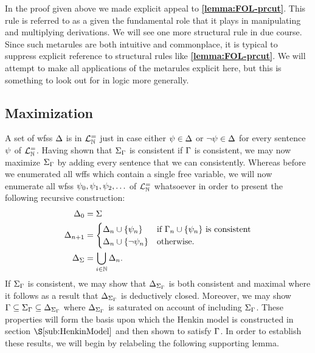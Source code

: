 In the proof given above we made explicit appeal to \textbf{\ref{lemma:FOL-prcut}}.
This rule is referred to as a  given the fundamental role that it plays in manipulating and multiplying derivations.
We will see one more structural rule in due course.
Since such metarules are both intuitive and commonplace, it is typical to suppress explicit reference to structural rules like \textbf{\ref{lemma:FOL-prcut}}.
We will attempt to make all applications of the metarules explicit here, but this is something to look out for in logic more generally.



\subsection{Maximization}%
  \label{sub:Maximization}
  
A set of wfss $\Delta$ is  in $\mathcal{L}^{=}_{\mathbb{N}}$ just in case either $\psi\in\Delta$ or $\neg\psi\in\Delta$ for every sentence $\psi$ of $\mathcal{L}^{=}_{\mathbb{N}}$.
Having shown that $\Sigma_{\Gamma}$ is consistent if $\Gamma$ is consistent, we may now maximize $\Sigma_{\Gamma}$ by adding every sentence that we can consistently. 
Whereas before we enumerated all wffs which contain a single free variable, we will now enumerate all wfss $\psi_0,\psi_1,\psi_2,\ldots$ of $\mathcal{L}^{=}_{\mathbb{N}}$ whatsoever in order to present the following recursive construction:
\begin{align*}
  \Delta_0     &= \Sigma \\
  \Delta_{n+1} &= 
    \begin{cases}
      \Delta_n\cup\lbrace\psi_n\rbrace &\text{if } \Gamma_n\cup\lbrace\psi_n\rbrace \text{ is consistent}\\
      \Delta_n\cup\lbrace\neg\psi_n\rbrace &\text{otherwise}.
    \end{cases}\\
  \Delta_{\Sigma} &= \bigcup_{i\in\mathbb{N}}\Delta_n. 
\end{align*}
If $\Sigma_{\Gamma}$ is consistent, we may show that $\Delta_{\Sigma_{\Gamma}}$ is both consistent and maximal where it follows as a result that $\Delta_{\Sigma_{\Gamma}}$ is deductively closed.
Moreover, we may show $\Gamma\subseteq\Sigma_{\Gamma}\subseteq\Delta_{\Sigma_{\Gamma}}$ where $\Delta_{\Sigma_{\Gamma}}$ is saturated on account of including $\Sigma_{\Gamma}$.
These properties will form the basis upon which the Henkin model is constructed in section $\S\ref{sub:HenkinModel}$ and then shown to satisfy $\Gamma$.
In order to establish these results, we will begin by relabeling the following supporting lemma.




